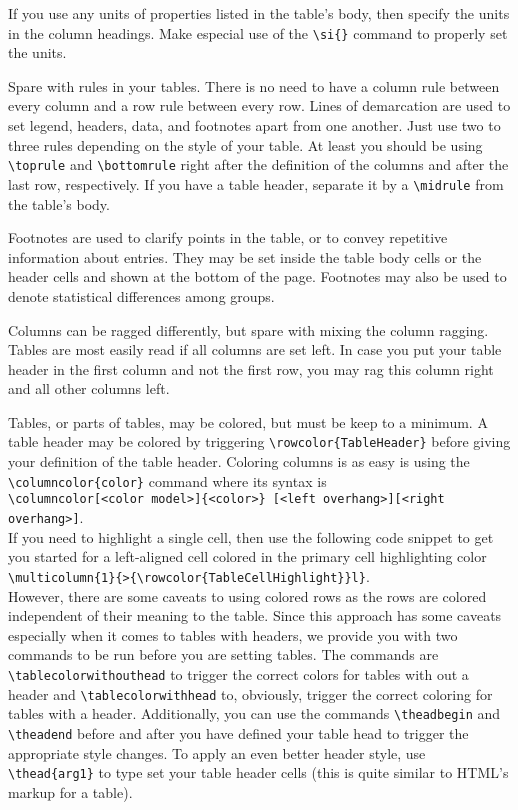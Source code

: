 If you use any units of properties listed in the table's body, then specify the units in the column headings.
Make especial use of the \lstinline!\si{}! command to properly set the units.

Spare with rules in your tables.
There is no need to have a column rule between every column and a row rule between every row.
Lines of demarcation are used to set legend, headers, data, and footnotes apart from one another.
Just use two to three rules depending on the style of your table.
At least you should be using \lstinline!\toprule! and \lstinline!\bottomrule! right after the definition of the columns and after the last row, respectively.
If you have a table header, separate it by a \lstinline!\midrule! from the table's body.

Footnotes are used to clarify points in the table, or to convey repetitive information about entries.
They may be set inside the table body cells or the header cells and shown at the bottom of the page.
Footnotes may also be used to denote statistical differences among groups.

Columns can be ragged differently, but spare with mixing the column ragging.
Tables are most easily read if all columns are set left.
In case you put your table header in the first column and not the first row, you may rag this column right and all other columns left.

Tables, or parts of tables, may be colored, but must be keep to a minimum.
A table header may be colored by triggering \lstinline|\rowcolor{TableHeader}| before giving your definition of the table header.
Coloring columns is as easy is using the \lstinline|\columncolor{color}| command where its syntax is\\\lstinline|\columncolor[<color model>]{<color>} [<left overhang>][<right overhang>]|.\\
If you need to highlight a single cell, then use the following code snippet to get you started for a left-aligned cell colored in the primary cell highlighting color\\ \lstinline|\multicolumn{1}{>{\rowcolor{TableCellHighlight}}l}|.\\
However, there are some caveats to using colored rows as the rows are colored independent of their meaning to the table.
Since this approach has some caveats especially when it comes to tables with headers, we provide you with two commands to be run before you are setting tables.
The commands are \lstinline|\tablecolorwithouthead| to trigger the correct colors for tables with out a header and \lstinline|\tablecolorwithhead| to, obviously, trigger the correct coloring for tables with a header.
Additionally, you can use the commands \lstinline!\theadbegin! and \lstinline!\theadend! before and after you have defined your table head to trigger the appropriate style changes.
To apply an even better header style, use \lstinline!\thead{arg1}! to type set your table header cells (this is quite similar to HTML's markup for a table).

